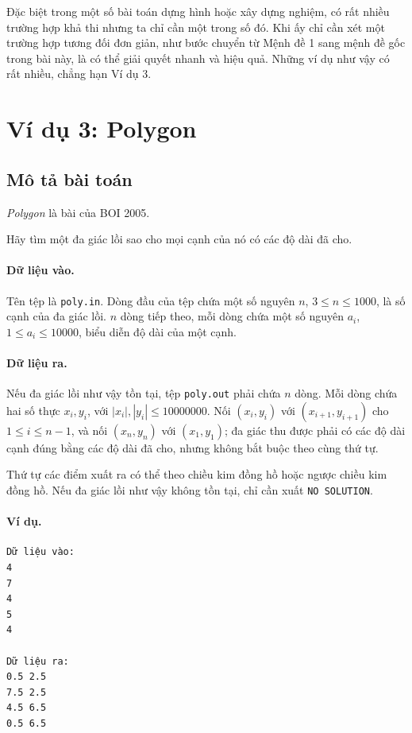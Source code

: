 \documentclass[11pt]{article}
\begin{document}
Đặc biệt trong một số bài toán dựng hình hoặc xây dựng nghiệm, có rất nhiều
trường hợp khả thi nhưng ta chỉ cần một trong số đó. Khi ấy chỉ cần xét một
trường hợp tương đối đơn giản, như bước chuyển từ Mệnh đề 1 sang mệnh đề gốc
trong bài này, là có thể giải quyết nhanh và hiệu quả. Những ví dụ như vậy có
rất nhiều, chẳng hạn Ví dụ 3.

\section{Ví dụ 3: Polygon}

\subsection{Mô tả bài toán}

\textit{Polygon} là bài của BOI 2005.

Hãy tìm một đa giác lồi sao cho mọi cạnh của nó có các độ dài đã cho.

\paragraph{Dữ liệu vào.}
Tên tệp là \texttt{poly.in}. Dòng đầu của tệp chứa một số nguyên
\(n\), \(3\le n\le 1000\), là số cạnh của đa giác lồi. \(n\) dòng tiếp theo,
mỗi dòng chứa một số nguyên \(a_i\), \(1\le a_i\le 10000\), biểu diễn độ dài
của một cạnh.

\paragraph{Dữ liệu ra.}
Nếu đa giác lồi như vậy tồn tại, tệp \texttt{poly.out} phải chứa \(n\) dòng.
Mỗi dòng chứa hai số thực \(x_i,y_i\), với
\(|x_i|,|y_i|\le 10000000\). Nối \((x_i,y_i)\) với
\((x_{i+1},y_{i+1})\) cho \(1\le i\le n-1\), và nối \((x_n,y_n)\) với
\((x_1,y_1)\); đa giác thu được phải có các độ dài cạnh đúng bằng các độ dài
đã cho, nhưng không bắt buộc theo cùng thứ tự.

Thứ tự các điểm xuất ra có thể theo chiều kim đồng hồ hoặc ngược chiều kim
đồng hồ. Nếu đa giác lồi như vậy không tồn tại, chỉ cần xuất
\texttt{NO SOLUTION}.

\paragraph{Ví dụ.}
\begin{verbatim}
Dữ liệu vào:
4
7
4
5
4

Dữ liệu ra:
0.5 2.5
7.5 2.5
4.5 6.5
0.5 6.5
\end{verbatim}
\end{document}
